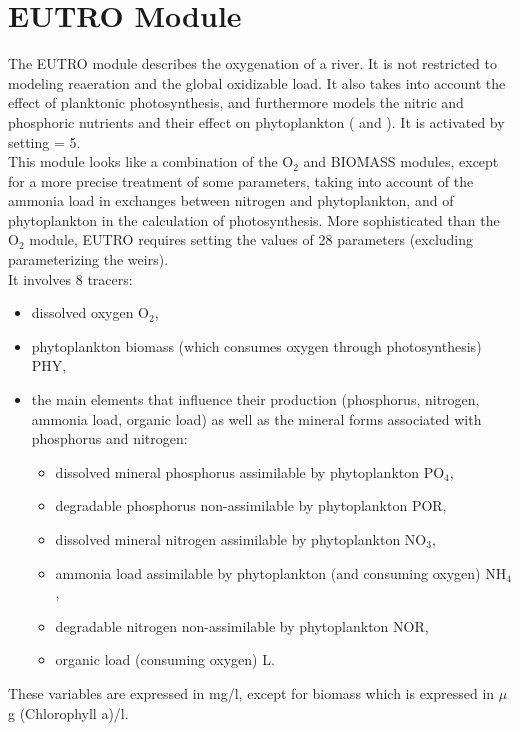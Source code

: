 \chapter{EUTRO Module}

The EUTRO module describes the oxygenation of a river.
It is not restricted to modeling reaeration and the global oxidizable load.
It also takes into account the effect of planktonic photosynthesis,
and furthermore models the nitric and phosphoric nutrients and their effect
on phytoplankton (\cite{gosse_doubs_1989} and \cite{gosse_doubs_1983}).
It is activated by setting  = 5.\\

This module looks like a combination of the O$_2$ and BIOMASS modules,
except for a more precise treatment of some parameters,
taking into account of the ammonia load in exchanges between nitrogen and phytoplankton,
and of phytoplankton in the calculation of photosynthesis.
More sophisticated than the O$_2$ module, EUTRO requires setting the values of
28 parameters (excluding parameterizing the weirs).\\

It involves 8 tracers:

\begin{itemize}
\item dissolved oxygen O$_2$,
\item phytoplankton biomass (which consumes oxygen through photosynthesis) PHY,
\item the main elements that influence their production
  (phosphorus, nitrogen, ammonia load, organic load)
  as well as the mineral forms associated with phosphorus and nitrogen:
\begin{itemize}
\item dissolved mineral phosphorus assimilable by phytoplankton PO$_4$,
\item degradable phosphorus non-assimilable by phytoplankton POR,
\item dissolved mineral nitrogen assimilable by phytoplankton NO$_3$,
\item ammonia load assimilable by phytoplankton (and consuming oxygen) NH$_4$,
\item degradable nitrogen non-assimilable by phytoplankton NOR,
\item organic load (consuming oxygen) L.
\end{itemize}
\end{itemize}

These variables are expressed in mg/l, except for biomass which is expressed in $\mu$g (Chlorophyll a)/l.\\

